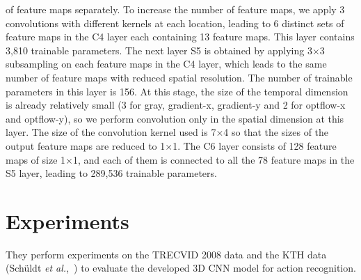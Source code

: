 \documentclass[10pt,twocolumn,letterpaper]{article}
\begin{document}
of feature maps separately. To increase the number of feature maps, we apply 3 convolutions with different kernels at each location, leading to 6 distinct sets of feature maps in the C4 layer each containing 13
feature maps. This layer contains 3,810 trainable parameters. The next layer S5 is obtained by applying 3$\times$3 subsampling on each feature maps in the C4 layer, which leads to the same number of feature maps with
reduced spatial resolution. The number of trainable parameters in this layer is 156. At this stage, the size of the temporal dimension is already relatively small (3 for gray, gradient-x, gradient-y and 2 for optflow-x
and optflow-y), so we perform convolution only in the spatial dimension at this layer. The size of the convolution kernel used is 7$\times$4 so that the sizes of the output feature maps are reduced to 1$\times$1. The C6 layer
consists of 128 feature maps of size 1$\times$1, and each of them is connected to all the 78 feature maps in the S5 layer, leading to 289,536 trainable parameters.
\section{Experiments}
They perform experiments on the TRECVID 2008 data and the KTH data (Schüldt \emph{et al.},~\cite{name4}) to evaluate the developed 3D CNN model for action recognition.
\end{document}
